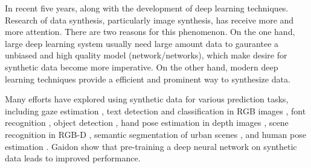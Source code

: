 \documentclass{iitthesis}
\begin{document}
In recent five years, along with the development of deep learning techniques. Research of data synthesis, particularly image synthesis, has receive more and more attention. There are two reasons for this phenomenon. On the one hand, large deep learning system usually need large amount data to gaurantee a unbiased and high quality model (network/networks), which make desire for synthetic data become more imperative. On the other hand, modern deep learning techniques provide a efficient and prominent way to synthesize data. 

Many efforts have explored using synthetic data for various prediction tasks, including gaze estimation \cite{wood2016learning}, text detection and classification in RGB images \cite{gupta2016synthetic}, font recognition \cite{wang2015deepfont}, object detection \cite{gupta2014learning}, hand pose estimation in depth images \cite{tompson2014real}\cite{supancic2015depth}, scene recognition in RGB-D , semantic segmentation of urban scenes \cite{ros2016synthia}, and human pose estimation 
\cite{park2015articulated}\cite{shakhnarovich2003fast}\cite{lecun2004learning}\cite{ionescu2014human3}\cite{pishchulin2012articulated}\cite{rogez2016mocap}.  Gaidon \cite{gaidon2016virtual} show that pre-training a deep neural network on synthetic data leads to improved performance.
\end{document}
